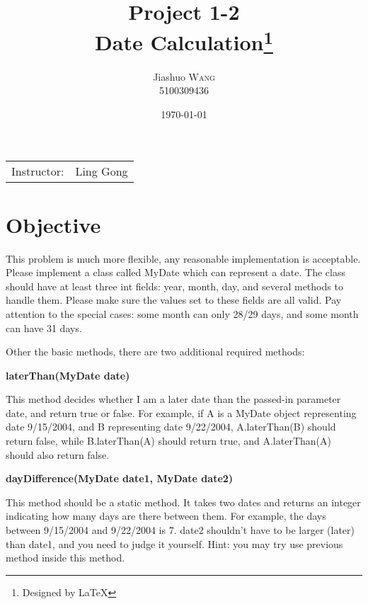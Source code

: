 \documentclass{article}
\title{Project 1-2 \\ Date Calculation\thanks{Designed by \LaTeX}} %
\author{Jiashuo \textsc{Wang} \\ 5100309436} %
\date{\today} %
\begin{document}
\maketitle %
\thispagestyle{fancy} %

\begin{center}
\begin{tabular}{l r}
Instructor: & Ling Gong %
\end{tabular}
\end{center}




\section{Objective}

This problem is much more flexible, any reasonable implementation is acceptable. Please implement a class called MyDate which can represent a date. The class should have at least three int fields: year, month, day, and several methods to handle them.  Please make sure the values set to these fields are all valid. Pay attention to the special cases: some month can only 28/29 days, and some month can have 31 days.

Other the basic methods, there are two additional required methods:

\begin{compactitem}
\item \textbf{laterThan(MyDate date)}

This method decides whether I am a later date than the passed-in parameter date, and return true or false. For example, if A is a MyDate object representing date 9/15/2004, and B representing date 9/22/2004, A.laterThan(B) should return false, while B.laterThan(A) should return true, and A.laterThan(A) should also return false.
\item \textbf{dayDifference(MyDate date1, MyDate date2)}

This method should be a static method. It takes two dates and returns an integer indicating how many days are there between them. For example, the days between 9/15/2004 and 9/22/2004 is 7.  date2 shouldn't have to be larger (later) than date1, and you need to judge it yourself.
    Hint: you may try use previous method inside this method.
\end{compactitem}
\end{document}
